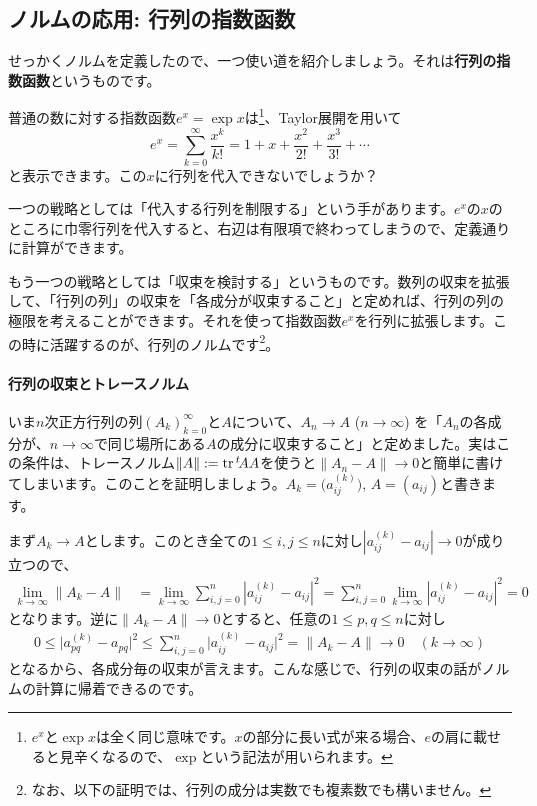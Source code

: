 \subsection{ノルムの応用: 行列の指数函数}

せっかくノルムを定義したので、一つ使い道を紹介しましょう。それは\textbf{行列の指数函数}というものです。

普通の数に対する指数函数$e^x = \exp x$は\footnote{$e^x$と$\exp x$は全く同じ意味です。$x$の部分に長い式が来る場合、$e$の肩に載せると見辛くなるので、$\exp$という記法が用いられます。}、Taylor展開を用いて
\[
e^x = \sum_{k = 0}^{\infty} \frac{x^k}{k!} = 1 + x + \frac{x^2}{2!} + \frac{x^3}{3!} + \cdots
\]
と表示できます。この$x$に行列を代入できないでしょうか？

一つの戦略としては「代入する行列を制限する」という手があります。$e^x$の$x$のところに巾零行列を代入すると、右辺は有限項で終わってしまうので、定義通りに計算ができます。

もう一つの戦略としては「収束を検討する」というものです。数列の収束を拡張して、「行列の列」の収束を「各成分が収束すること」と定めれば、行列の列の極限を考えることができます。それを使って指数函数$e^x$を行列に拡張します。この時に活躍するのが、行列のノルムです\footnote{なお、以下の証明では、行列の成分は実数でも複素数でも構いません。}。

\paragraph{行列の収束とトレースノルム}

いま$n$次正方行列の列$(A_k)_{k = 0}^{\infty}$と$A$について、$A_n \rightarrow A$ ($n\rightarrow\infty$) を「$A_n$の各成分が、$n \rightarrow \infty$で同じ場所にある$A$の成分に収束すること」と定めました。実はこの条件は、トレースノルム$\|A\| := \operatorname{tr} {}^t\!A A$を使うと$\|A_n - A\| \rightarrow 0$と簡単に書けてしまいます。このことを証明しましょう。$A_k = \bigl(a^{(k)}_{ij}\bigr)$, $A = (a_{ij})$と書きます。

まず$A_k \rightarrow A$とします。このとき全ての$1 \leq i, j \leq n$に対し$|a^{(k)}_{ij} - a_{ij}| \rightarrow 0$が成り立つので、
\begin{align*}
\lim_{k \rightarrow \infty} \|A_k - A\|
&= \lim_{k \rightarrow \infty} \sum_{i, j = 0}^n |a^{(k)}_{ij} - a_{ij}|^2 
= \sum_{i, j = 0}^n \lim_{k \rightarrow \infty} |a^{(k)}_{ij} - a_{ij}|^2 
= 0
\end{align*}
となります。逆に$\|A_k - A\| \rightarrow 0$とすると、任意の$1\leq p, q\leq n$に対し
\begin{align*}
0
\leq \bigl| a^{(k)}_{pq} - a_{pq} \bigr|^2
\leq \sum_{i, j = 0}^n \bigl| a^{(k)}_{ij} - a_{ij} \bigr|^2
= \|A_k - A\|
\rightarrow 0 \quad (k \rightarrow \infty)
\end{align*}
となるから、各成分毎の収束が言えます。こんな感じで、行列の収束の話がノルムの計算に帰着できるのです。

